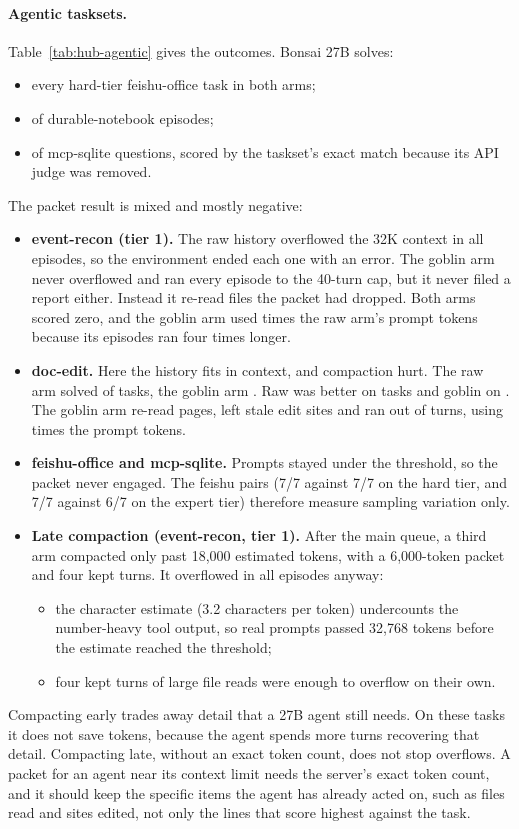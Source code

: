 \paragraph{Agentic tasksets.}
Table~\ref{tab:hub-agentic} gives the outcomes. Bonsai 27B solves:
\begin{itemize}
\item every hard-tier feishu-office task in both arms;
\item \HubNotebookHardenedSolved{} of \HubNotebookHardenedN{} durable-notebook episodes;
\item \HubSqliteAllSolved{} of \HubSqliteAllN{} mcp-sqlite questions, scored by the taskset's exact match because its
API judge was removed.
\end{itemize}
The packet result is mixed and mostly negative:
\begin{itemize}
\item \textbf{event-recon (tier 1).} The raw history overflowed the 32K context in all \HubErTOneRawN{} episodes, so the
environment ended each one with an error. The goblin arm never overflowed and ran every episode to the 40-turn cap,
but it never filed a report either. Instead it re-read files the packet had dropped. Both arms scored zero, and the
goblin arm used \HubErTOneRatio{} times the raw arm's prompt tokens because its episodes ran four times longer.
\item \textbf{doc-edit.} Here the history fits in context, and compaction hurt. The raw arm solved
\HubDoceditRawSolved{} of \HubDoceditRawN{} tasks, the goblin arm \HubDoceditGoblinSolved{}. Raw was better on
\HubDoceditRawBetter{} tasks and goblin on \HubDoceditGoblinBetter{}. The goblin arm re-read pages, left stale edit sites
and ran out of turns, using \HubDoceditRatio{} times the prompt tokens.
\item \textbf{feishu-office and mcp-sqlite.} Prompts stayed under the threshold, so the packet never engaged. The
feishu pairs (7/7 against 7/7 on the hard tier, and 7/7 against 6/7 on the expert tier) therefore measure sampling
variation only.
\item \textbf{Late compaction (event-recon, tier 1).} After the main queue, a third arm compacted only past 18,000
estimated tokens, with a 6,000-token packet and four kept turns. It overflowed in all \HubErTOneLateN{} episodes
anyway:
  \begin{itemize}
  \item the character estimate (3.2 characters per token) undercounts the number-heavy tool output, so real prompts
  passed 32,768 tokens before the estimate reached the threshold;
  \item four kept turns of large file reads were enough to overflow on their own.
  \end{itemize}
\end{itemize}
Compacting early trades away detail that a 27B agent still needs. On these tasks it does not save tokens, because the
agent spends more turns recovering that detail. Compacting late, without an exact token count, does not stop
overflows. A packet for an agent near its context limit needs the server's exact token count, and it should keep the
specific items the agent has already acted on, such as files read and sites edited, not only the lines that score
highest against the task.
